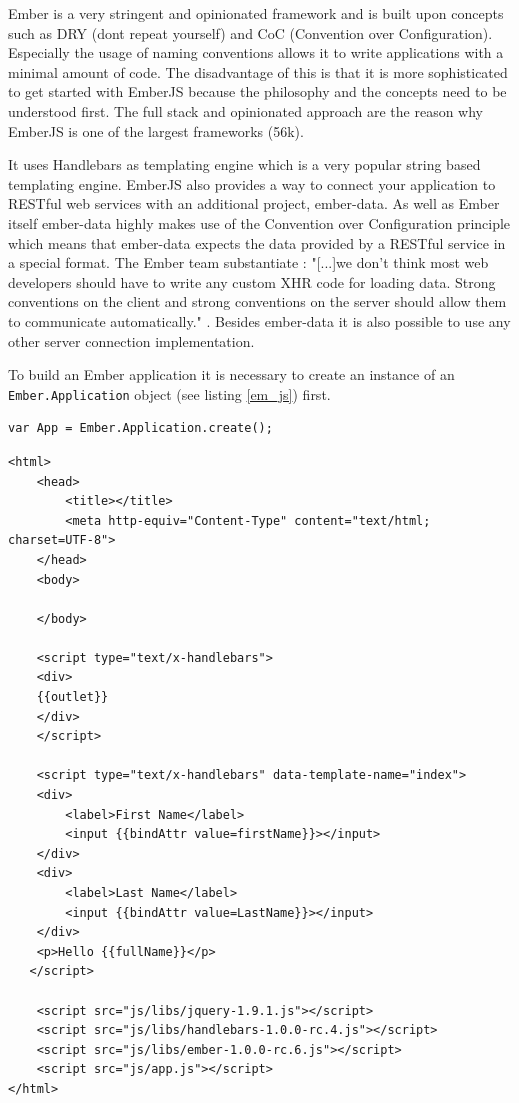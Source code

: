 Ember is a very stringent and opinionated framework and is built upon concepts such as DRY (dont repeat yourself) and CoC (Convention over Configuration).
Especially the usage of naming conventions allows it to write applications with a minimal amount of code.
The disadvantage of this is that it is more sophisticated to get started with EmberJS because the philosophy and the concepts need to be understood first.
The full stack and opinionated approach are the reason why EmberJS is one of the largest frameworks (56k).

It uses Handlebars as templating engine which is a very popular string based templating engine.
EmberJS also provides a way to connect your application to RESTful web services with an additional project, ember-data.
As well as Ember itself ember-data highly makes use of the Convention over Configuration principle which means that ember-data expects the data provided by a RESTful service in a special format.
The Ember team substantiate : "[...]we don't think most web developers should have to write any custom XHR code for loading data.
Strong conventions on the client and strong conventions on the server should allow them to communicate automatically." \autocite{tech-ana:ember-data}.
Besides ember-data it is also possible to use any other server connection implementation.

To build an Ember application it is necessary to create an instance of an \texttt{Ember.Application} object (see listing \ref{em_js}) first.
\begin{lstlisting}[label=em_js, caption=app.js]
var App = Ember.Application.create();
\end{lstlisting}

\begin{lstlisting}[label=em_html,caption=index.html]
<html>
    <head>
        <title></title>
        <meta http-equiv="Content-Type" content="text/html; charset=UTF-8">
    </head>
    <body>

    </body>
    
    <script type="text/x-handlebars">
	<div>
	{{outlet}}
	</div>
    </script>

    <script type="text/x-handlebars" data-template-name="index">
	<div>
		<label>First Name</label> 
		<input {{bindAttr value=firstName}}></input>
	</div>
	<div>
		<label>Last Name</label> 
		<input {{bindAttr value=LastName}}></input>
	</div>
	<p>Hello {{fullName}}</p>
   </script>

    <script src="js/libs/jquery-1.9.1.js"></script>
    <script src="js/libs/handlebars-1.0.0-rc.4.js"></script>
    <script src="js/libs/ember-1.0.0-rc.6.js"></script>
    <script src="js/app.js"></script>
</html>
\end{lstlisting}

